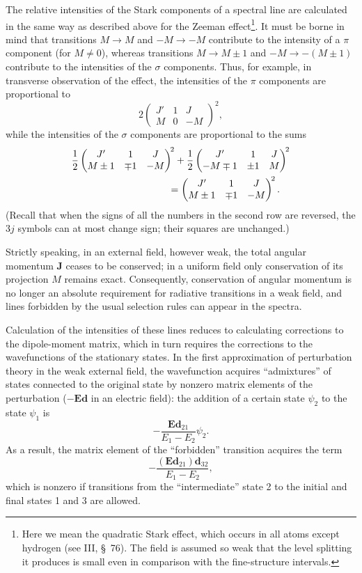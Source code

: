The relative intensities of the Stark components of a spectral line are calculated in the same way as described above for the Zeeman effect\footnote{Here we mean the quadratic Stark effect, which occurs in all atoms except hydrogen (see III, \S~76). The field is assumed so weak that the level splitting it produces is small even in comparison with the fine-structure intervals.}. It must be borne in mind that transitions $M\to M$ and $-M\to-M$ contribute to the intensity of a $\pi$ component (for $M\ne0$), whereas transitions $M\to M\pm1$ and $-M\to-(M\pm1)$ contribute to the intensities of the $\sigma$ components. Thus, for example, in transverse observation of the effect, the intensities of the $\pi$ components are proportional to
\[
2\begin{pmatrix}J'&1&J\\M&0&-M\end{pmatrix}^{\!2},
\]
while the intensities of the $\sigma$ components are proportional to the sums
\[
\begin{aligned}
&\frac12\begin{pmatrix}J'&1&J\\M\pm1&\mp1&-M\end{pmatrix}^{\!2}
+\frac12\begin{pmatrix}J'&1&J\\-M\mp1&\pm1&M\end{pmatrix}^{\!2}\\
&\hspace{35mm}=
\begin{pmatrix}J'&1&J\\M\pm1&\mp1&-M\end{pmatrix}^{\!2}.
\end{aligned}
\]
(Recall that when the signs of all the numbers in the second row are reversed, the $3j$ symbols can at most change sign; their squares are unchanged.)

Strictly speaking, in an external field, however weak, the total angular momentum $\mathbf J$ ceases to be conserved; in a uniform field only conservation of its projection $M$ remains exact. Consequently, conservation of angular momentum is no longer an absolute requirement for radiative transitions in a weak field, and lines forbidden by the usual selection rules can appear in the spectra.

Calculation of the intensities of these lines reduces to calculating corrections to the dipole-moment matrix, which in turn requires the corrections to the wavefunctions of the stationary states. In the first approximation of perturbation theory in the weak external field, the wavefunction acquires ``admixtures'' of states connected to the original state by nonzero matrix elements of the perturbation ($-\mathbf E\mathbf d$ in an electric field): the addition of a certain state $\psi_2$ to the state $\psi_1$ is
\[
-\frac{\mathbf E\mathbf d_{21}}{E_1-E_2}\psi_2.
\]
As a result, the matrix element of the ``forbidden'' transition acquires the term
\[
-\frac{(\mathbf E\mathbf d_{21})\mathbf d_{32}}{E_1-E_2},
\]
which is nonzero if transitions from the ``intermediate'' state 2 to the initial and final states 1 and 3 are allowed.
